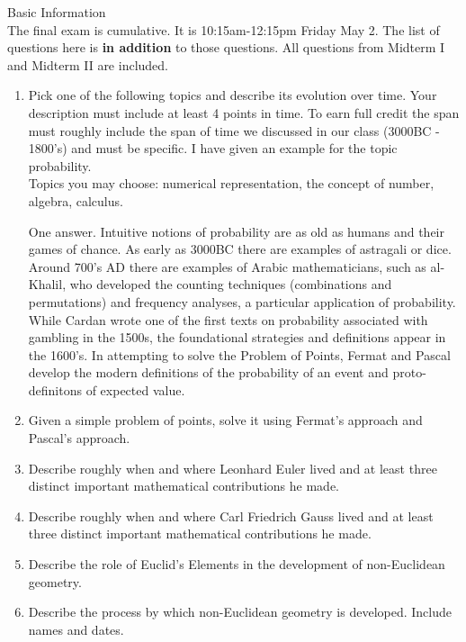 \documentclass[12pt]{article}
\renewcommand{\emph}[1]{\textsf{\textbf{#1}}}
\begin{document}
\noindent Basic Information\\
The final exam is cumulative. It is 10:15am-12:15pm Friday May 2. The list of questions here is \emph{in addition} to those questions. All questions from Midterm I and Midterm II are included.  \\

\begin{enumerate}
\item Pick one of the following topics and describe its evolution over time. Your description must include at least 4 points in time. To earn full credit the span must roughly include the span of time we discussed in our class (3000BC - 1800's) and must be specific. I have given an example for the topic probability.\\
Topics you may choose: numerical representation, the concept of number, algebra, calculus.

One answer.
Intuitive notions of probability are as old as humans and their games of chance. As early as 3000BC there are examples of astragali or dice. Around 700's AD there are examples of Arabic mathematicians, such as al-Khalil, who developed the counting techniques (combinations and permutations) and frequency analyses, a particular application of probability. While Cardan wrote one of the first texts on probability associated with gambling in the 1500s, the foundational strategies and definitions appear in the 1600's. In attempting to solve the Problem of Points, Fermat and Pascal develop the modern definitions of the probability of an event and proto-definitons of expected value.

\item Given a simple problem of points, solve it using Fermat's approach and Pascal's approach.

\item Describe roughly when and where Leonhard Euler lived and at least three distinct important mathematical contributions he made.

\item Describe roughly when and where Carl Friedrich Gauss lived and at least three distinct important mathematical contributions he made. 

\item Describe the role of Euclid's Elements in the development of non-Euclidean geometry. 

\item Describe the process by which non-Euclidean geometry is developed. Include names and dates.


\end{enumerate}
\end{document}

